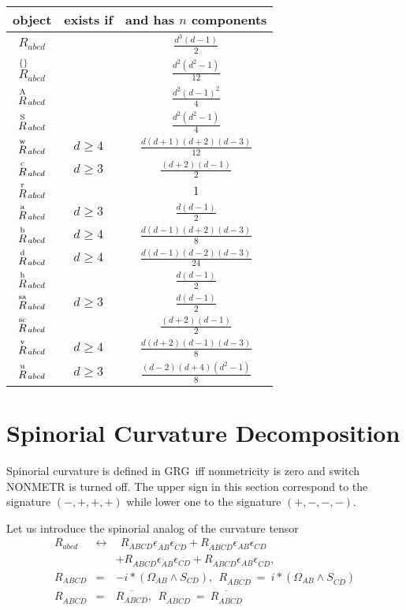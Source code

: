 \documentclass[twoside,openright]{report}
\newcommand{\grgtt}{\ttfamily}
\newcommand{\rim}[1]{\stackrel{\scriptscriptstyle\{\}}{#1}\!}
\newcommand{\tsst}{\longleftrightarrow}
\newcommand{\vv}{\vphantom{\rule{5mm}{5mm}}}
\newcommand{\RR}[1]{\stackrel{\rm #1}{R}\!{}}
\renewcommand{\tt}{\grgtt}
\newcommand{\grg}{{\sc GRG}}
\newcommand{\comm}[1]{{\upshape\tt#1}}    %
\begin{document}
\begin{center}
\begin{tabular}{|c|c|c|}
\hline object & exists if & and has $n$ components \\
\hline
\vv$R_{abcd}$ &     & $\frac{d^3(d-1)}{2}$ \\[1mm]
\hline\vv$\rim{R}{}_{abcd}$  &        & $\frac{d^2(d^2-1)}{12}$ \\[1mm]
\hline\vv$\RR{A}_{abcd}$  &        & $\frac{d^2(d-1)^2}{4}$ \\[1mm]
\hline\vv$\RR{S}_{abcd}$  &        & $\frac{d^2(d^2-1)}{4}$ \\[1mm]
\hline\vv$\RR{w}_{abcd}$  & $d\geq4$ & $\frac{d(d+1)(d+2)(d-3)}{12}$ \\
\vv$\RR{c}_{abcd}$  & $d\geq3$ & $\frac{(d+2)(d-1)}{2}$ \\
\vv$\RR{r}_{abcd}$  &          & $1$ \\[1mm]
\hline\vv$\RR{a}_{abcd}$  & $d\geq3$ & $\frac{d(d-1)}{2}$ \\
\vv$\RR{b}_{abcd}$  & $d\geq4$ & $\frac{d(d-1)(d+2)(d-3)}{8}$ \\
\vv$\RR{d}_{abcd}$  & $d\geq4$ & $\frac{d(d-1)(d-2)(d-3)}{24}$ \\[1mm]
\hline\vv$\RR{h}_{abcd}$  &          & $\frac{d(d-1)}{2}$ \\
\vv$\RR{sa}_{abcd}$ & $d\geq3$ & $\frac{d(d-1)}{2}$ \\
\vv$\RR{sc}_{abcd}$ &          & $\frac{(d+2)(d-1)}{2}$ \\
\vv$\RR{v}_{abcd}$  & $d\geq4$ & $\frac{d(d+2)(d-1)(d-3)}{8}$ \\
\vv$\RR{u}_{abcd}$  & $d\geq3$ & $\frac{(d-2)(d+4)(d^2-1)}{8}$ \\[1mm]
\hline
\end{tabular}
\end{center}



\section{Spinorial Curvature Decomposition}

Spinorial curvature is defined in \grg\ iff nonmetricity
is zero and switch \comm{NONMETR} is turned off.
The upper sign in this section correspond to the signature
${\scriptstyle(-,+,+,+)}$ while lower one to the signature
${\scriptstyle(+,-,-,-)}$.

Let us introduce the spinorial analog of the curvature tensor
\begin{eqnarray}
R_{abcd}&\tsst&
\ \ R_{ABCD}\epsilon_{\dot{A}\dot{B}}\epsilon_{\dot{C}\dot{D}}
+R_{\dot{A}\dot{B}\dot{C}\dot{D}}\epsilon_{AB}\epsilon_{CD} \nonumber\\[1mm]
&&+R_{AB\dot{C}\dot{D}}\epsilon_{\dot{A}\dot{B}}\epsilon_{CD}
+R_{\dot{A}\dot{B} CD}\epsilon_{AB}\epsilon_{\dot{C}\dot{D}},  \\[1.5mm]
R_{ABCD}&=&-i*(\Omega_{AB}\wedge S_{CD}),\ \
R_{AB\dot{C}\dot{D}}\ =\ i*(\Omega_{AB}\wedge S_{\dot{C}\dot{D}})\\[1.5mm]
R_{\dot{A}\dot{B}\dot{C}\dot{D}}&=&\overline{R_{ABCD}},\ \
R_{\dot{A}\dot{B} CD}\ =\ \overline{R_{AB\dot{C}\dot{D}}}
\end{eqnarray}
\end{document}
